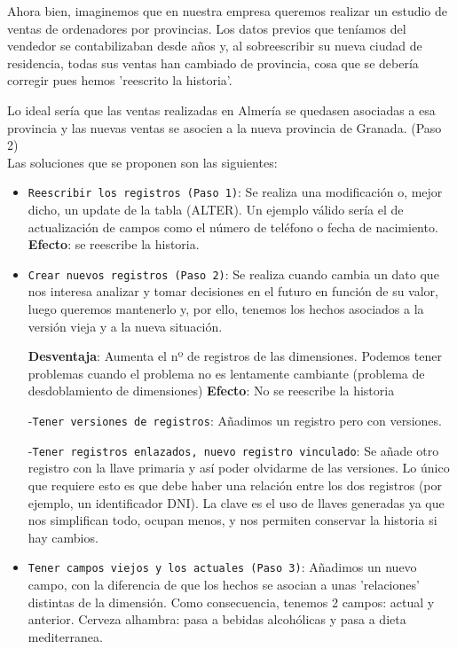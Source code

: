	Ahora bien, imaginemos que en nuestra empresa queremos realizar un estudio de ventas de ordenadores por provincias. Los datos previos que teníamos del vendedor se contabilizaban desde años y, al sobreescribir su nueva ciudad de residencia, todas sus ventas han cambiado de provincia, cosa que se debería corregir pues hemos 'reescrito la historia'.
	
	Lo ideal sería que las ventas realizadas en Almería se quedasen asociadas a esa provincia y las nuevas ventas se asocien a la nueva provincia de Granada. (Paso 2)  \\
	
	Las soluciones que se proponen son las siguientes:
	\begin{itemize}
		\item \texttt{Reescribir los registros (Paso 1)}: Se realiza una modificación o, mejor dicho, un update de la tabla (ALTER). Un ejemplo válido sería el de actualización de campos como el número de teléfono o fecha de nacimiento.
		\textbf{Efecto}: se reescribe la historia.
		
		\item \texttt{Crear nuevos registros (Paso 2)}: Se realiza cuando cambia un dato que nos interesa analizar y tomar decisiones en el futuro en función de su valor, luego queremos mantenerlo y, por ello, tenemos los hechos asociados a la versión vieja y a la nueva situación.
		
		\textbf{Desventaja}: Aumenta el nº de registros de las dimensiones. Podemos tener problemas cuando el problema no es lentamente cambiante (problema de desdoblamiento de dimensiones)
		\textbf{Efecto}: No se reescribe la historia
		
		-\texttt{Tener versiones de registros}: Añadimos un registro pero con versiones.
		
		-\texttt{Tener registros enlazados, nuevo registro vinculado}: Se añade otro registro con la llave primaria y así poder olvidarme de las versiones. Lo único que requiere esto es que debe haber una relación entre los dos registros (por ejemplo, un identificador DNI). 
		La clave es el uso de llaves generadas ya que nos simplifican todo, ocupan menos, y nos permiten conservar la historia si hay cambios.
		
		\item \texttt{Tener campos viejos y los actuales (Paso 3)}: Añadimos un nuevo campo, con la diferencia de que los hechos se asocian a unas 'relaciones' distintas de la dimensión.
		Como consecuencia, tenemos 2 campos: actual y anterior.
		Cerveza alhambra: pasa a bebidas alcohólicas y pasa a dieta mediterranea.
		

\end{itemize}
